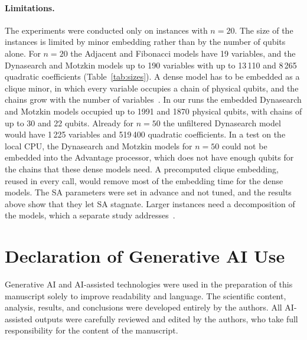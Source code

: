 \documentclass[10pt,twoside,twocolumn,a4paper]{article}
\newif\ifrevmarks \revmarksfalse
\newenvironment{revblock}{\ifrevmarks\color{red}\fi}{}
\begin{document}
\begin{revblock}
\paragraph{Limitations.} The experiments were conducted only on instances with $n=20$. The size of the instances is limited by minor embedding rather than by the number of qubits alone. For $n=20$ the Adjacent and Fibonacci models have 19 variables, and the Dynasearch and Motzkin models up to 190 variables with up to 13\,110 and 8\,265 quadratic coefficients (Table~\ref{tab:sizes}). A dense model has to be embedded as a clique minor, in which every variable occupies a chain of physical qubits, and the chains grow with the number of variables~\cite{Cai2014}. In our runs the embedded Dynasearch and Motzkin models occupied up to 1991 and 1870 physical qubits, with chains of up to 30 and 22 qubits. Already for $n=50$ the unfiltered Dynasearch model would have 1\,225 variables and 519\,400 quadratic coefficients. In a test on the local CPU, the Dynasearch and Motzkin models for $n=50$ could not be embedded into the Advantage processor, which does not have enough qubits for the chains that these dense models need. A precomputed clique embedding, reused in every call, would remove most of the embedding time for the dense models. The SA parameters were set in advance and not tuned, and the results above show that they let SA stagnate. Larger instances need a decomposition of the models, which a separate study addresses~\cite{WojewodzkiBozejkoSSRN}.
\end{revblock}

%


\section*{Declaration of Generative AI Use}
Generative AI and AI-assisted technologies were used in the preparation of this manuscript solely to improve readability and language. The scientific content, analysis, results, and conclusions were developed entirely by the authors. All AI-assisted outputs were carefully reviewed and edited by the authors, who take full responsibility for the content of the manuscript.





\end{document}
